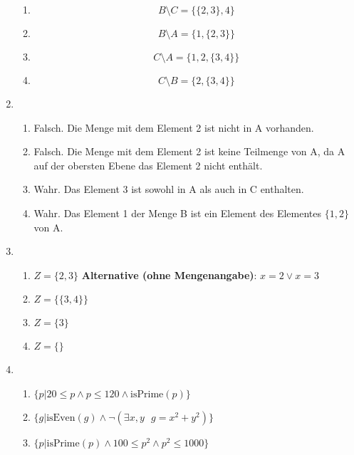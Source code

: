 \documentclass[a4paper]{article}
\begin{document}
\begin{enumerate}
\begin{enumerate}
			\item
			\begin{equation*}
				B \text{\textbackslash} C = \{\{2, 3\}, 4\}
			\end{equation*}
			\item
			\begin{equation*}
				B \text{\textbackslash} A = \{1, \{2, 3\}\}
			\end{equation*}
			
			\item
			\begin{equation*}
				C \text{\textbackslash} A = \{1, 2, \{3, 4\}\}
			\end{equation*}
			\item
			\begin{equation*}
				C \text{\textbackslash} B = \{2, \{3, 4\}\}
			\end{equation*}
		\end{enumerate}
		
		\item
		\begin{enumerate}
			\item Falsch. Die Menge mit dem Element 2 ist nicht in A vorhanden.
			\item Falsch. Die Menge mit dem Element 2 ist keine Teilmenge von A, da A auf der obersten Ebene das Element 2 nicht enthält.
			\item Wahr. Das Element 3 ist sowohl in A als auch in C enthalten.
			\item Wahr. Das Element 1 der Menge B ist ein Element des Elementes $\{1, 2\}$ von A.
		\end{enumerate}
		\clearpage
		
		\item
		\begin{enumerate}
			\item $Z = \{2, 3\}$ \textbf{Alternative (ohne Mengenangabe)}: $x = 2 \lor x = 3$
			\item $Z = \{\{3, 4\}\}$
			\item $Z = \{3\}$
			\item $Z = \{\}$
		\end{enumerate}
		
		\item
		\begin{enumerate}
			\item $\{p | 20 \leq p \land p \leq 120 \land \text{isPrime}(p)\}$
			\item $\{g | \text{isEven}(g) \land \lnot (\exists x, y \text{ } g = x^{2} + y^{2})\}$
			\item $\{p | \text{isPrime}(p) \land 100 \leq p^{2} \land p^{2} \leq 1000\}$
		\end{enumerate}
		

\end{enumerate}
\end{document}
